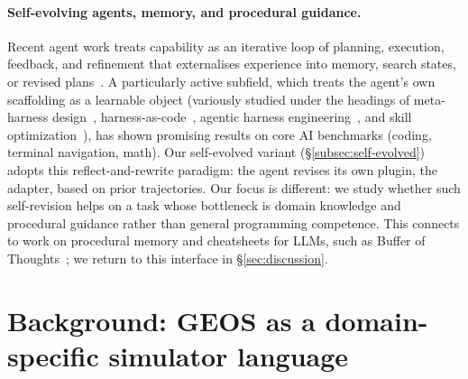\documentclass{article}
\begin{document}
\paragraph{Self-evolving agents, memory, and procedural guidance.}
Recent agent work treats capability as an iterative loop of planning, execution, feedback, and refinement that externalises experience into memory, search states, or revised plans~\citep{bran2024chemcrow,boiko2023coscientist,alber2025cellvoyager,lu2024aiscientist,zhang2026scinav,li2026agentflow,tang2026eigenagent,narayanan2024aviary}. A particularly active subfield, which treats the agent's own scaffolding as a learnable object (variously studied under the headings of meta-harness design~\cite{lee2026metaharness}, harness-as-code~\cite{ning2026codeagentharness}, agentic harness engineering~\cite{lin2026agenticharnessengineer}, and skill optimization~\cite{yang2026skillopt}), has shown promising results on core AI benchmarks (coding, terminal navigation, math).
Our self-evolved variant (\S\ref{subsec:self-evolved}) adopts this reflect-and-rewrite paradigm: the agent revises its own plugin, the adapter, based on prior trajectories.
Our focus is different: we study whether such self-revision helps on a task whose bottleneck is domain knowledge and procedural guidance rather than general programming competence. This connects to work on procedural memory and cheatsheets for LLMs, such as Buffer of Thoughts~\citep{yang2024bot}; we return
to this interface in \S\ref{sec:discussion}.


\section{Background: GEOS as a domain-specific simulator language}
\label{sec:background}
\end{document}
